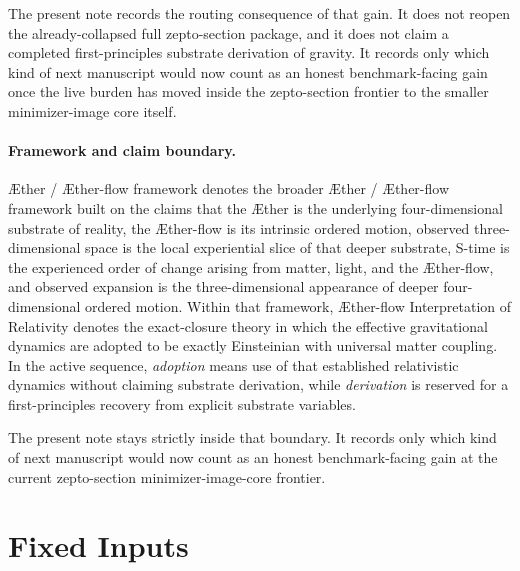 \documentclass[11pt]{article}
\newcommand{\Aether}{\AE{}ther}
\newcommand{\Aflow}{\AE{}ther-flow}
\newcommand{\TheoryName}{\Aflow{} Interpretation of Relativity}
\newcommand{\TheoryProgram}{\Aether{} / \Aflow{} framework}
\begin{document}
The present note records the routing consequence of that gain. It does not reopen the already-collapsed full zepto-section package, and it does not claim a completed first-principles substrate derivation of gravity. It records only which kind of next manuscript would now count as an honest benchmark-facing gain once the live burden has moved inside the zepto-section frontier to the smaller minimizer-image core itself.

\paragraph{Framework and claim boundary.}
\TheoryProgram{} denotes the broader \Aether{} / \Aflow{} framework built on the claims that the \Aether{} is the underlying four-dimensional substrate of reality, the \Aflow{} is its intrinsic ordered motion, observed three-dimensional space is the local experiential slice of that deeper substrate, S-time is the experienced order of change arising from matter, light, and the \Aflow{}, and observed expansion is the three-dimensional appearance of deeper four-dimensional ordered motion. Within that framework, \TheoryName{} denotes the exact-closure theory in which the effective gravitational dynamics are adopted to be exactly Einsteinian with universal matter coupling. In the active sequence, \emph{adoption} means use of that established relativistic dynamics without claiming substrate derivation, while \emph{derivation} is reserved for a first-principles recovery from explicit substrate variables.

The present note stays strictly inside that boundary. It records only which kind of next manuscript would now count as an honest benchmark-facing gain at the current zepto-section minimizer-image-core frontier.

\section{Fixed Inputs}
\end{document}
